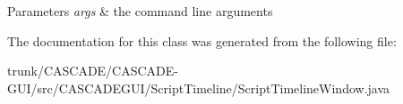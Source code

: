 \begin{DoxyParams}{Parameters}
{\em args} & the command line arguments \\
\hline
\end{DoxyParams}


The documentation for this class was generated from the following file\-:\begin{DoxyCompactItemize}
\item 
trunk/\-C\-A\-S\-C\-A\-D\-E/\-C\-A\-S\-C\-A\-D\-E-\/\-G\-U\-I/src/\-C\-A\-S\-C\-A\-D\-E\-G\-U\-I/\-Script\-Timeline/Script\-Timeline\-Window.\-java\end{DoxyCompactItemize}
